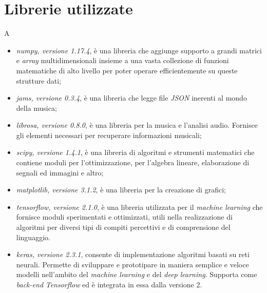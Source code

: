 \section{Librerie utilizzate}
A
\begin{itemize}
	\item \textit{numpy, versione 1.17.4}, è una libreria che aggiunge supporto a grandi matrici e \textit{array} multidimensionali insieme a una vasta collezione di funzioni matematiche di alto livello per poter operare efficientemente su queste strutture dati;
	\item \textit{jams, versione 0.3.4}, è una libreria che legge file \textit{JSON} inerenti al mondo della musica;
	\item \textit{librosa, versione 0.8.0}, è una libreria per la musica e l'analisi audio. Fornisce gli elementi necessari per recuperare informazioni musicali;
	\item \textit{scipy, versione 1.4.1}, è una libreria di algoritmi e strumenti matematici che contiene moduli per l'ottimizzazione, per l'algebra lineare, elaborazione di segnali ed immagini e altro;
	\item \textit{matplotlib, versione 3.1.2}, è una libreria per la creazione di grafici;
	\item \textit{tensorflow, versione 2.1.0}, è una libreria utilizzata per il \textit{machine learning} che fornisce moduli sperimentati e ottimizzati, utili nella realizzazione di algoritmi per diversi tipi di compiti percettivi e di comprensione del linguaggio.
	\item \textit{keras, versione 2.3.1}, consente di implementazione algoritmi basati su reti neurali. Permette di sviluppare e prototipare in maniera semplice e veloce modelli nell’ambito del \textit{machine learning} e del \textit{deep learning}. Supporta come \textit{back-end} \textit{Tensorflow} ed è integrata in essa dalla versione 2.
\end{itemize}

